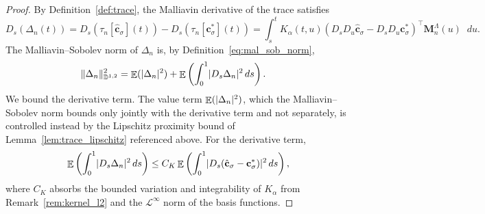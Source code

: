 \documentclass[11pt, a4paper]{article}
\theoremstyle{theoremstyle}
\theoremstyle{definitionstyle}
\newcommand{\dd}{\mathop{}\!d}
\DeclareMathOperator{\EE}{\mathbb E}
\DeclarePairedDelimiter{\norm}{\lVert}{\rVert}
\DeclarePairedDelimiter{\abs}{\lvert}{\rvert}
\begin{document}
\begin{proof}
    By Definition~\ref{def:trace}, the Malliavin derivative of the trace satisfies
    \begin{equation}
        D_s(\Delta_n(t)) = D_s(\tau_n[\hat{\mathbf c}_\sigma](t)) - D_s(\tau_n[\mathbf c^*_\sigma](t)) = \int_s^t K_\alpha(t, u)(D_s D_u \hat{\mathbf c}_\sigma - D_s D_u \mathbf c^*_\sigma)^\top \mathbf M_n^\Lambda(u) \dd{u}.
    \end{equation}
    The Malliavin--Sobolev norm of $\Delta_n$ is, by Definition~\eqref{eq:mal_sob_norm},
    \begin{align}
        \norm{\Delta_n}_{\mathbb D^{1,2}}^2 &= \EE(\abs{\Delta_n}^2) + \EE\left(\int_0^1 \abs{D_s \Delta_n}^2 \dd{s}\right).
    \end{align}
    We bound the derivative term. The value term $\EE(\abs{\Delta_n}^2)$, which the Malliavin--Sobolev norm bounds only jointly with the derivative term and not separately, is controlled instead by the Lipschitz proximity bound of Lemma~\ref{lem:trace_lipschitz} referenced above. For the derivative term,
    \begin{equation}
        \EE\left(\int_0^1 \abs{D_s \Delta_n}^2 \dd{s}\right) \leq C_K \EE\left(\int_0^1 \abs{D_s(\hat{\mathbf c}_\sigma - \mathbf c^*_\sigma)}^2 \dd{s}\right),
    \end{equation}
    where $C_K$ absorbs the bounded variation and integrability of $K_\alpha$ from Remark~\ref{rem:kernel_l2} and the $\mathcal L^\infty$ norm of the basis functions.


\end{proof}
\end{document}
